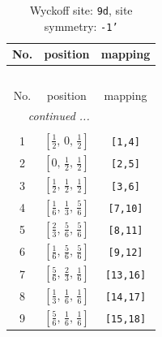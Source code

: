 \documentclass[fleqn,8pt]{jsarticle}
\begin{document}
\begin{longtable}{ccc}
\caption{Wyckoff site: {\tt 9d}, site symmetry: {\tt -1'}}
 \\
 \hline \hline
No. & position & mapping \\ \hline \endfirsthead

\multicolumn{2}{l}{\tablename\ \thetable{}} \\
 \hline \hline
No. & position & mapping \\ \hline \endhead

 \hline \hline
\multicolumn{2}{r}{\footnotesize\it continued ...} \\ \endfoot

 \hline \hline
\multicolumn{2}{r}{} \\ \endlastfoot

1 & $\left[ \frac{1}{2},\, 0,\, \frac{1}{2} \right]$ & {\tt [1,4]} \\ \hline
2 & $\left[ 0,\, \frac{1}{2},\, \frac{1}{2} \right]$ & {\tt [2,5]} \\ \hline
3 & $\left[ \frac{1}{2},\, \frac{1}{2},\, \frac{1}{2} \right]$ & {\tt [3,6]} \\ \hline
4 & $\left[ \frac{1}{6},\, \frac{1}{3},\, \frac{5}{6} \right]$ & {\tt [7,10]} \\ \hline
5 & $\left[ \frac{2}{3},\, \frac{5}{6},\, \frac{5}{6} \right]$ & {\tt [8,11]} \\ \hline
6 & $\left[ \frac{1}{6},\, \frac{5}{6},\, \frac{5}{6} \right]$ & {\tt [9,12]} \\ \hline
7 & $\left[ \frac{5}{6},\, \frac{2}{3},\, \frac{1}{6} \right]$ & {\tt [13,16]} \\ \hline
8 & $\left[ \frac{1}{3},\, \frac{1}{6},\, \frac{1}{6} \right]$ & {\tt [14,17]} \\ \hline
9 & $\left[ \frac{5}{6},\, \frac{1}{6},\, \frac{1}{6} \right]$ & {\tt [15,18]} \\
\end{longtable}
\renewcommand{\arraystretch}{1.2}
\end{document}
